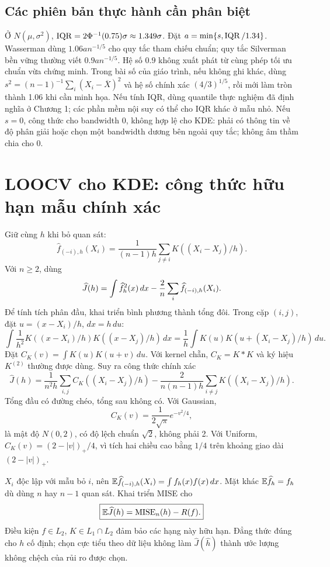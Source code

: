 \subsection{Các phiên bản thực hành cần phân biệt}
Ở $N(\mu,\sigma^2)$, $\operatorname{IQR}=2\Phi^{-1}(0.75)\sigma\approx1.349\sigma$.
Đặt $a=\min\{s,\operatorname{IQR}/1.34\}$. Wasserman dùng $1.06a n^{-1/5}$
cho quy tắc tham chiếu chuẩn; quy tắc Silverman bền vững thường viết
$0.9a n^{-1/5}$. Hệ số $0.9$ không xuất phát từ cùng phép tối ưu chuẩn
vừa chứng minh.
Trong bài số của giáo trình, nếu không ghi khác, dùng
$s^2=(n-1)^{-1}\sum_i(X_i-\overline X)^2$ và hệ số chính xác
$(4/3)^{1/5}$, rồi mới làm tròn thành 1.06 khi cần minh họa.
Nếu tính IQR, dùng quantile thực nghiệm đã định nghĩa ở Chương 1;
các phần mềm nội suy có thể cho IQR khác ở mẫu nhỏ.
Nếu $s=0$, công thức cho bandwidth 0, không hợp lệ cho KDE:
phải có thông tin về độ phân giải hoặc chọn một bandwidth dương bên ngoài
quy tắc; không âm thầm chia cho 0.

\section{LOOCV cho KDE: công thức hữu hạn mẫu chính xác}
Giữ cùng $h$ khi bỏ quan sát:
\[
\widehat f_{(-i),h}(X_i)=\frac1{(n-1)h}
\sum_{j\ne i}K((X_i-X_j)/h).
\]
Với $n\geq2$, dùng
\[
\widehat J(h)=\int\widehat f_h^2(x)\,dx
-\frac2n\sum_i\widehat f_{(-i),h}(X_i).
\]
Để tính tích phân đầu, khai triển bình phương thành tổng đôi. Trong cặp
$(i,j)$, đặt $u=(x-X_i)/h$, $dx=h\,du$:
\[
\int\frac1{h^2}K((x-X_i)/h)K((x-X_j)/h)\,dx
=\frac1h\int K(u)K(u+(X_i-X_j)/h)\,du.
\]
Đặt $C_K(v)=\int K(u)K(u+v)\,du$. Với kernel chẵn,
$C_K=K*K$ và ký hiệu $K^{(2)}$ thường được dùng.
Suy ra công thức chính xác
\[
\boxed{\widehat J(h)=\frac1{n^2h}\sum_{i,j}C_K((X_i-X_j)/h)
-\frac2{n(n-1)h}\sum_{i\ne j}K((X_i-X_j)/h).}
\]
Tổng đầu có đường chéo, tổng sau không có. Với Gaussian,
\[
C_K(v)=\frac1{2\sqrt\pi}e^{-v^2/4},
\]
là mật độ $N(0,2)$, có độ lệch chuẩn $\sqrt2$, không phải 2.
Với Uniform, $C_K(v)=(2-|v|)_+/4$, vì tích hai chiều cao bằng $1/4$
trên khoảng giao dài $(2-|v|)_+$.

$X_i$ độc lập với mẫu bỏ $i$, nên
$\mathbb E\widehat f_{(-i),h}(X_i)=\int f_h(x)f(x)\,dx$.
Mặt khác $\mathbb E\widehat f_h=f_h$ dù dùng $n$ hay $n-1$ quan sát.
Khai triển MISE cho
\[
\boxed{\mathbb E\widehat J(h)=\operatorname{MISE}_n(h)-R(f).}
\]
Điều kiện $f\in L_2$, $K\in L_1\cap L_2$ đảm bảo các hạng này hữu hạn.
Đẳng thức đúng cho $h$ cố định; chọn cực tiểu theo dữ liệu không làm
$\widehat J(\widehat h)$ thành ước lượng không chệch của rủi ro được chọn.

